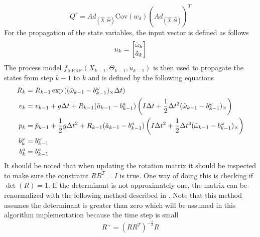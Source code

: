 \begin{equation}
    Q^r = Ad_{(\hat{X},\hat{\Theta})} \mathrm{Cov}(w_d) (Ad_{(\hat{X},\hat{\Theta})})^T
    \label{eq: Q RInEKF}
\end{equation}
For the propagation of the state variables, the input vector is defined as follows
\begin{equation}
        u_k = \begin{bmatrix}
            \Tilde{\omega}_k \\
             \Tilde{a}_k \\
        \end{bmatrix} 
    \label{eq: inputs IMU InEKF}
\end{equation}
The process model $f_\text{InEKF}(X_{k-1},\Theta_{k-1},u_{k-1})$ is then used to propagate the states from step $k-1$ to $k$ and is defined by the following equations
\begin{subequations}
    \label{eq: f InEKF}
    \begin{align}
        R_k &= R_{k-1} \exp{( (\Tilde{\omega}_{k-1} - b^{\omega}_{k-1})_{\times} \Delta t)}\\
        v_k &= v_{k-1} + g \Delta t + R_{k-1} (\Tilde{a}_{k-1} - b^{a}_{k-1}) 
        \left( I \Delta t + \frac{1}{2} \Delta t^2 (\Tilde{\omega}_{k-1} - b^{\omega}_{k-1})_{\times} \right) \label{eq:v for f InEKF} \\
        p_k &= \bar{p}_{k-1} + \frac{1}{2} g \Delta t^2 + R_{k-1} (\Tilde{a}_{k-1} - b^{a}_{k-1}) 
        \left( I \Delta t^2 + \frac{1}{2} \Delta t^3 (\Tilde{\omega}_{k-1} - b^{\omega}_{k-1})_{\times} \right) \label{eq:p for f InEKF} \\
        b^{\omega}_{k} &= b^{\omega}_{k-1} \label{eq:b^(omega) for f InEKF}\\
        b^{a}_{k} &= b^{a}_{k-1} \label{eq:b^a for f InEKF} 
    \end{align}
\end{subequations}
It should be noted that when updating the rotation matrix it should be inspected to make sure the constraint $R R^T = I$ is true. One way of doing this is checking if $\operatorname{det} (R)=1$. If the determinant is not approximately one, the matrix can be renormalized with the following method described in \cite{green1952orthogonal}. Note that this method assumes the determinant is greater than zero which will be assumed in this algorithm implementation because the time step is small
\begin{equation}
    R^+ = (R R^T)^{- \frac{1}{2}} R
    \label{eq: normalize R}
\end{equation}

